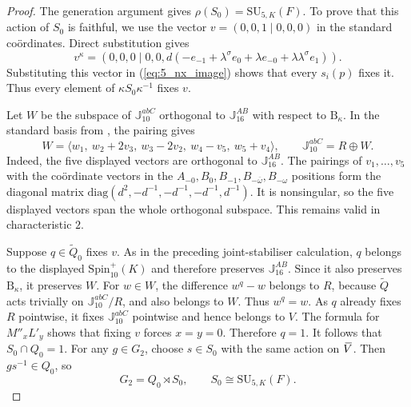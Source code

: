 \documentclass{amsart}
\def\ovV{\mathord{\mbox{\hspace*{0pt}}\,\overline{\!V\!\!\;}\!\:}\mbox{\hspace*{0pt}}}
\newcommand{\diag}{\mathrm{diag}}
\newcommand{\SU}{\mathrm{SU}}
\newcommand{\Spin}{\mathrm{Spin}}
\newcommand{\J}{\mathbb{J}}
\renewcommand{\bar}{\overline}
\newcommand{\B}{\mathrm{B}}
\newcommand{\s}{\sigma}
\theoremstyle{plain}
\numberwithin{theorem}{section}
\theoremstyle{definition}
\begin{document}
\begin{proof}
	The generation argument gives $\rho(S_0)=\SU_{5,K}(F)$.  To prove that
	this action of $S_0$ is faithful, we use the vector $v=(0,0,1\mid0,0,0)$
	in the standard co\"{o}rdinates.  Direct substitution gives
	\begin{equation*}
		v^\kappa=(0,0,0\mid0,0,
		d(-e_{-1}+\lambda^{\s}e_0+\lambda e_{-0}
		+\lambda\lambda^{\s}e_1)).
	\end{equation*}
	Substituting this vector in (\ref{eq:5_nx_image}) shows that every
	$s_i(p)$ fixes it.  Thus every element of $\kappa S_0\kappa^{-1}$ fixes $v$.

	Let $W$ be the subspace of $\J_{10}^{abC}$ orthogonal to $\J_{16}^{AB}$
	with respect to $\B_\kappa$.  In the standard basis from
	\cite[Lemma~11.5]{BSW1}, the pairing gives
	\begin{equation}
		\label{eq:7_type2_complement_space}
		W=\langle w_1,\ w_2+2v_3,\ w_3-2v_2,\ w_4-v_5,\ w_5+v_4\rangle,
		\qquad \J_{10}^{abC}=R\oplus W.
	\end{equation}
	Indeed, the five displayed vectors are orthogonal to $\J_{16}^{AB}$.
	The pairings of $v_1,\ldots,v_5$ with the co\"{o}rdinate vectors in the
	$A_{-0},B_0,B_{-1},B_{-\bar\omega},B_{-\omega}$ positions form the diagonal
	matrix $\diag(d^2,-d^{-1},-d^{-1},-d^{-1},d^{-1})$.
	It is nonsingular, so the five displayed vectors span the whole
	orthogonal subspace.  This remains valid in characteristic $2$.

	Suppose $q\in\widetilde Q_0$ fixes $v$.  As in the preceding
	joint-stabiliser calculation, $q$ belongs to the displayed
	$\Spin_{10}^{+}(K)$ and therefore preserves $\J_{16}^{AB}$.  Since it also
	preserves $\B_\kappa$, it preserves $W$.  For $w\in W$, the difference
	$w^q-w$ belongs to $R$, because $\widetilde Q$ acts trivially on
	$\J_{10}^{abC}/R$, and also belongs to $W$.  Thus $w^q=w$.
	As $q$ already fixes $R$ pointwise, it fixes $\J_{10}^{abC}$ pointwise
	and hence belongs to $V$.  The formula for $M''_xL'_y$ shows that fixing
	$v$ forces $x=y=0$.  Therefore $q=1$.
	It follows that $S_0\cap Q_0=1$.  For any $g\in G_2$, choose $s\in S_0$
	with the same action on $\ovV$.  Then $gs^{-1}\in Q_0$, so
	\begin{equation}
		\label{eq:7_type2_split}
		G_2=Q_0\rtimes S_0,\qquad S_0\cong\SU_{5,K}(F).
	\end{equation}


\end{proof}
\end{document}
